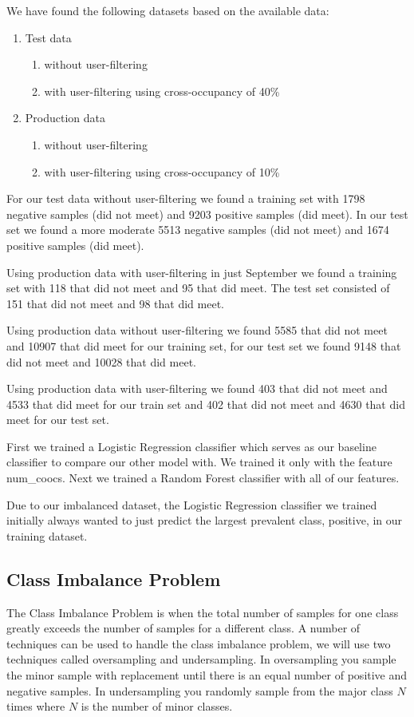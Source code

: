We have found the following datasets based on the available data:
\begin{enumerate}
\item Test data
\begin{enumerate}
\item without user-filtering
\item with user-filtering using cross-occupancy of 40\%
\end{enumerate}
\item Production data
\begin{enumerate}
\item without user-filtering
\item with user-filtering using cross-occupancy of 10\%
\end{enumerate}
\end{enumerate}

For our test data without user-filtering we found a training set with 1798 negative samples (did not meet) and 9203 positive samples (did meet). In our test set we found a more moderate 5513 negative samples (did not meet) and 1674 positive samples (did meet).

Using production data with user-filtering in just September we found a training set with 118 that did not meet and 95 that did meet. The test set consisted of 151 that did not meet and 98 that did meet. 

Using production data without user-filtering we found 5585 that did not meet and 10907 that did meet for our training set, for our test set we found 9148 that did not meet and 10028 that did meet.

Using production data with user-filtering we found 403 that did not meet and 4533 that did meet for our train set and 402 that did not meet and 4630 that did meet for our test set.

First we trained a Logistic Regression classifier which serves as our baseline classifier to compare our other model with. We trained it only with the feature num\_coocs. Next we trained a Random Forest classifier with all of our features.

Due to our imbalanced dataset, the Logistic Regression classifier we trained initially always wanted to just predict the largest prevalent class, positive, in our training dataset.

\subsection{Class Imbalance Problem}
The Class Imbalance Problem is when the total number of samples for one class greatly exceeds the number of samples for a different class. A number of techniques can be used to handle the class imbalance problem, we will use two techniques called oversampling and undersampling\cite{tan2006introduction}. In oversampling you sample the minor sample with replacement until there is an equal number of positive and negative samples. In undersampling you randomly sample from the major class $N$ times where $N$ is the number of minor classes.

